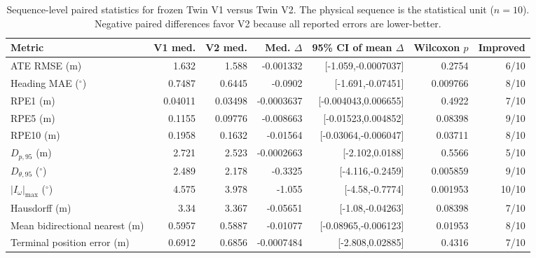 \begin{table}[t]
\caption{Sequence-level paired statistics for frozen Twin V1 versus Twin V2. The physical sequence is the statistical unit ($n=10$). Negative paired differences favor V2 because all reported errors are lower-better.}
\label{tab:paired_stats}
\centering\scriptsize
\begin{tabular}{lrrrrrr}
\toprule
Metric & V1 med. & V2 med. & Med. $\Delta$ & 95\% CI of mean $\Delta$ & Wilcoxon $p$ & Improved \\
\midrule
ATE RMSE (m) & 1.632 & 1.588 & -0.001332 & [-1.059,-0.0007037] & 0.2754 & 6/10 \\
Heading MAE ($^\circ$) & 0.7487 & 0.6445 & -0.0902 & [-1.691,-0.07451] & 0.009766 & 8/10 \\
RPE1 (m) & 0.04011 & 0.03498 & -0.0003637 & [-0.004043,0.006655] & 0.4922 & 7/10 \\
RPE5 (m) & 0.1155 & 0.09776 & -0.008663 & [-0.01523,0.004852] & 0.08398 & 9/10 \\
RPE10 (m) & 0.1958 & 0.1632 & -0.01564 & [-0.03064,-0.006047] & 0.03711 & 8/10 \\
$D_{p,95}$ (m) & 2.721 & 2.523 & -0.0002663 & [-2.102,0.0188] & 0.5566 & 5/10 \\
$D_{\theta,95}$ ($^\circ$) & 2.489 & 2.178 & -0.3325 & [-4.116,-0.2459] & 0.005859 & 9/10 \\
$|I_\omega|_{\max}$ ($^\circ$) & 4.575 & 3.978 & -1.055 & [-4.58,-0.7774] & 0.001953 & 10/10 \\
Hausdorff (m) & 3.34 & 3.367 & -0.05651 & [-1.08,-0.04263] & 0.08398 & 7/10 \\
Mean bidirectional nearest (m) & 0.5957 & 0.5887 & -0.01077 & [-0.08965,-0.006123] & 0.01953 & 8/10 \\
Terminal position error (m) & 0.6912 & 0.6856 & -0.0007484 & [-2.808,0.02885] & 0.4316 & 7/10 \\
\bottomrule
\end{tabular}
\end{table}